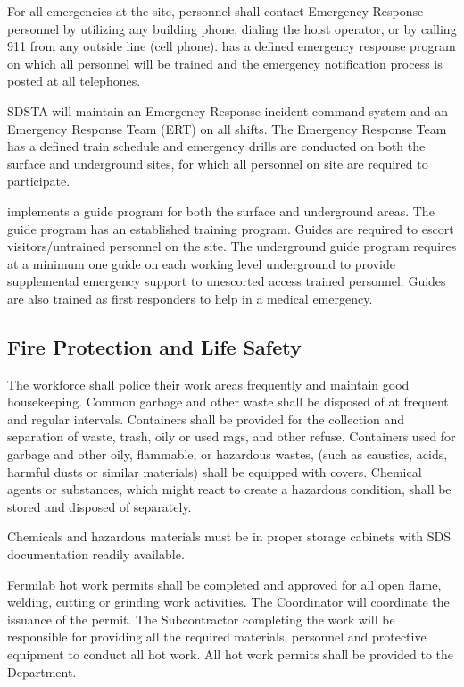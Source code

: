 For all emergencies at the \surf site, personnel shall contact
Emergency Response personnel by utilizing any building phone, dialing
the hoist operator, or by calling 911 from any outside line (cell
phone).  \surf has a defined emergency response program on which all
personnel will be trained and the emergency notification process is
posted at all telephones.

SDSTA will maintain an Emergency Response incident command system
and an Emergency Response Team (ERT) on all shifts. The Emergency
Response Team has a defined train schedule and emergency drills are
conducted on both the surface and underground sites, for which all
personnel on site are required to participate.

\surf implements a guide program for both the surface and underground
areas. The guide program has an established training program. Guides
are required to escort visitors/untrained personnel on the \surf
site. The underground guide program requires at a minimum one guide on
each working level underground to provide supplemental emergency
support to unescorted access trained personnel. Guides are also
trained as first responders to help in a medical emergency.

\subsection{Fire Protection and Life Safety}

The workforce shall police their work areas frequently and maintain
good housekeeping. Common garbage and other waste shall be disposed of
at frequent and regular intervals. Containers shall be provided for
the collection and separation of waste, trash, oily or used rags, and
other refuse.  Containers used for garbage and other oily, flammable,
or hazardous wastes, (such as caustics, acids, harmful dusts or
similar materials) shall be equipped with covers.  Chemical agents or
substances, which might react to create a hazardous condition, shall
be stored and disposed of separately.

Chemicals and hazardous materials must be in proper storage cabinets
with SDS documentation readily available.

Fermilab hot work permits shall be completed and approved for all open
flame, welding, cutting or grinding work activities.  The 
 Coordinator will coordinate the issuance of the permit.
The Subcontractor completing the work will be responsible for
providing all the required materials, personnel and protective
equipment to conduct all hot work. All hot work permits shall be
provided to the \surf {} Department.

